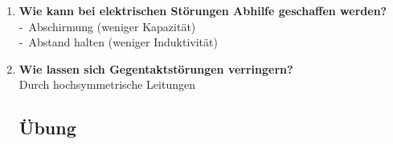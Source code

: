 \documentclass[a4paper,12pt]{article}
\newcommand{\questionnopage}[2]{\pagebreak[3]\item {\textbf{#1?}}#2}
\newcommand{\catchword}[1]{\\-\ #1}
\newcommand{\normaltext}[1]{\\#1}
\begin{document}
\begin{enumerate}
  \questionnopage{Wie kann bei elektrischen Störungen Abhilfe geschaffen werden}
  {
    \catchword{Abschirmung (weniger Kapazität)}
    \catchword{Abstand halten (weniger Induktivität)}
  }

  \questionnopage{Wie lassen sich Gegentaktstörungen verringern}
  {
    \normaltext{Durch hochsymmetrische Leitungen}
  }

  \subsection{Übung}

\end{enumerate}
\end{document}
